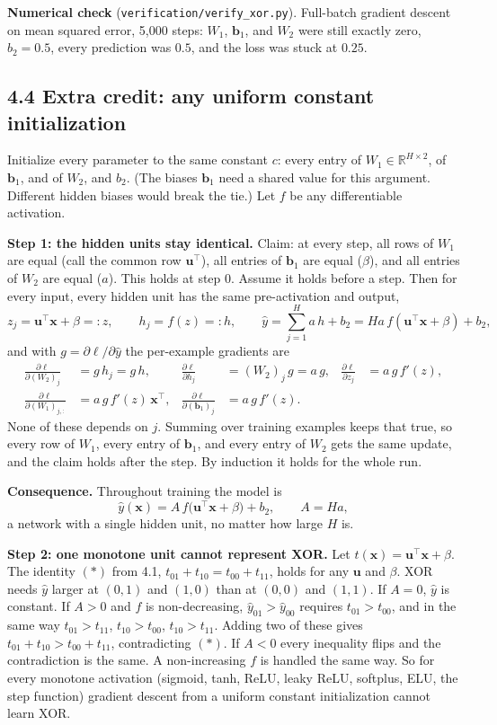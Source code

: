 \documentclass[11pt]{article}
\newcommand{\R}{\mathbb{R}}
\begin{document}
\textbf{Numerical check} (\texttt{verification/verify\_xor.py}). Full-batch gradient descent on mean squared error, 5{,}000 steps: $W_1$, $\mathbf{b}_1$, and $W_2$ were still exactly zero, $b_2 = 0.5$, every prediction was $0.5$, and the loss was stuck at $0.25$.

\subsection*{4.4 Extra credit: any uniform constant initialization}
Initialize every parameter to the same constant $c$: every entry of $W_1\in\R^{H\times2}$, of $\mathbf{b}_1$, and of $W_2$, and $b_2$. (The biases $\mathbf{b}_1$ need a shared value for this argument. Different hidden biases would break the tie.) Let $f$ be any differentiable activation.

\textbf{Step 1: the hidden units stay identical.} Claim: at every step, all rows of $W_1$ are equal (call the common row $\mathbf{u}^\top$), all entries of $\mathbf{b}_1$ are equal ($\beta$), and all entries of $W_2$ are equal ($a$). This holds at step 0. Assume it holds before a step. Then for every input, every hidden unit has the same pre-activation and output,
\[
z_j = \mathbf{u}^\top\mathbf{x}+\beta =: z,\qquad h_j = f(z) =: h,\qquad \hat y = \textstyle\sum_{j=1}^H a\,h + b_2 = Ha\,f(\mathbf{u}^\top\mathbf{x}+\beta) + b_2 ,
\]
and with $g = \partial\ell/\partial\hat y$ the per-example gradients are
\begin{align*}
\frac{\partial\ell}{\partial (W_2)_j} &= g\,h_j = g\,h, &
\frac{\partial\ell}{\partial h_j} &= (W_2)_j\,g = a\,g, &
\frac{\partial\ell}{\partial z_j} &= a\,g\,f'(z),\\
\frac{\partial\ell}{\partial (W_1)_{j,:}} &= a\,g\,f'(z)\,\mathbf{x}^\top, &
\frac{\partial\ell}{\partial (\mathbf{b}_1)_j} &= a\,g\,f'(z).
\end{align*}
None of these depends on $j$. Summing over training examples keeps that true, so every row of $W_1$, every entry of $\mathbf{b}_1$, and every entry of $W_2$ gets the same update, and the claim holds after the step. By induction it holds for the whole run.

\textbf{Consequence.} Throughout training the model is
\[
\hat y(\mathbf{x}) = A\,f\big(\mathbf{u}^\top\mathbf{x}+\beta\big) + b_2,\qquad A = Ha,
\]
a network with a single hidden unit, no matter how large $H$ is.

\textbf{Step 2: one monotone unit cannot represent XOR.} Let $t(\mathbf{x}) = \mathbf{u}^\top\mathbf{x}+\beta$. The identity $(\ast)$ from 4.1, $t_{01}+t_{10} = t_{00}+t_{11}$, holds for any $\mathbf{u}$ and $\beta$. XOR needs $\hat y$ larger at $(0,1)$ and $(1,0)$ than at $(0,0)$ and $(1,1)$. If $A = 0$, $\hat y$ is constant. If $A>0$ and $f$ is non-decreasing, $\hat y_{01} > \hat y_{00}$ requires $t_{01} > t_{00}$, and in the same way $t_{01}>t_{11}$, $t_{10}>t_{00}$, $t_{10}>t_{11}$. Adding two of these gives $t_{01}+t_{10} > t_{00}+t_{11}$, contradicting $(\ast)$. If $A<0$ every inequality flips and the contradiction is the same. A non-increasing $f$ is handled the same way. So for every monotone activation (sigmoid, tanh, ReLU, leaky ReLU, softplus, ELU, the step function) gradient descent from a uniform constant initialization cannot learn XOR.
\end{document}

